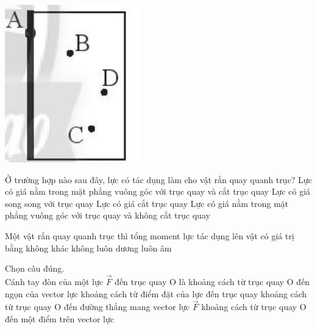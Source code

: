 \begin{ex}
	{\vspace{-0.75cm}\includegraphics[scale=0.6]{../figs/D10-KTTX3-001-7}}
	\loigiai{}
\end{ex}
\begin{ex}
	Ở trường hợp nào sau đây, lực có tác dụng làm cho vật rắn quay quanh trục?
	\choice
	{Lực có giá nằm trong mặt phẳng vuông góc với trục quay và cắt trục quay}
	{Lực có giá song song với trục quay}
	{Lực có giá cắt trục quay}
	{\True Lực có giá nằm trong mặt phẳng vuông góc với trục quay và không cắt trục quay}
	\loigiai{}
\end{ex}
\begin{ex}
	Một vật rắn quay quanh trục thì tổng moment lực tác dụng lên vật có giá trị
	\choice
	{bằng không}
	{\True khác không}
	{luôn dương}
	{luôn âm}
	\loigiai{}
\end{ex}
\begin{ex}
	Chọn câu đúng.\\
	Cánh tay đòn của một lực $\vec{F}$ đến trục quay O là
	\choice
	{khoảng cách từ trục quay O đến ngọn của vector lực}
	{khoảng cách từ điểm đặt của lực đến trục quay}
	{\True khoảng cách từ trục quay O đến đường thẳng mang vector lực $\vec{F}$}
	{khoảng cách từ trục quay O đến một điểm trên vector lực}
	\loigiai{}
\end{ex}
